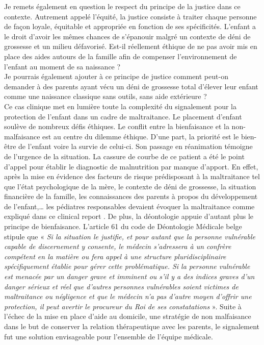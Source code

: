 Je remets également en question le respect du principe de la justice dans ce contexte. Autrement appelé l’équité, la justice consiste à traiter chaque personne de façon loyale, équitable et appropriée en fonction de ses spécificités. L’enfant a le droit d’avoir les mêmes chances de s’épanouir malgré un contexte de déni de grossesse et un milieu défavorisé. Est-il réellement éthique de ne pas avoir mis en place des aides autours de la famille afin de compenser l’environnement de l’enfant au moment de sa naissance ?\\

Je pourrais également ajouter à ce principe de justice comment peut-on demander à des parents ayant vécu un déni de grossesse total d’élever leur enfant comme une naissance classique sans outils, sans aide extérieure ?\\

Ce cas clinique met en lumière toute la complexité du signalement pour la protection de l’enfant dans un cadre de maltraitance. Le placement d’enfant soulève de nombreux défis éthiques. Le conflit entre la bienfaisance et la non-malfaisance est au centre du dilemme éthique. D’une part, la priorité est le bien-être de l’enfant voire la survie de celui-ci. Son passage en réanimation témoigne de l’urgence de la situation. La cassure de courbe de ce patient a été le point d’appel pour établir le diagnostic de malnutrition par manque d’apport. En effet, après la mise en évidence des facteurs de risque prédisposant à la maltraitance tel que l’état psychologique de la mère, le contexte de déni de grossesse, la situation financière de la famille, les connaissances des parents à propos du développement de l’enfant,…  les pédiatres responsables devaient évoquer la maltraitance comme expliqué dans ce clinical report \textcite{block2005failure}. De plus, la déontologie appuie d’autant plus le principe de bienfaisance. L’article 61 du code de Déontologie Médicale belge stipule que « \textit{Si la situation le justifie, et pour autant que la personne vulnérable capable de discernement y consente, le médecin s'adressera à un confrère compétent en la matière ou fera appel à une structure pluridisciplinaire spécifiquement établie pour gérer cette problématique. Si la personne vulnérable est menacée par un danger grave et imminent ou s'il y a des indices graves d'un danger sérieux et réel que d'autres personnes vulnérables soient victimes de maltraitance ou négligence et que le médecin n'a pas d'autre moyen d'offrir une protection, il peut avertir le procureur du Roi de ses constatations }». Suite à l’échec de la mise en place d’aide au domicile, une stratégie de non malfaisance dans le but de conserver la relation thérapeutique avec les parents, le signalement fut une solution envisageable pour l’ensemble de l’équipe médicale.\\

